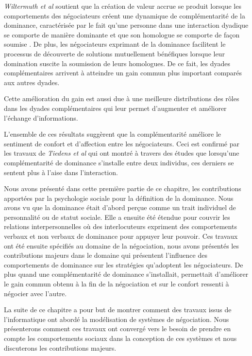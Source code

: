 	\emph{Wiltermuth et al} soutient que la création de valeur accrue se produit lorsque les comportements des négociateurs créent une dynamique de complémentarité de la dominance, caractérisée par le fait qu'une personne dans une interaction dyadique se comporte de manière dominante et que son homologue se comporte de façon soumise \cite{wiltermuth2015benefits}. De plus, les négociateurs exprimant de la dominance facilitent le processus de découverte de solutions mutuellement bénéfiques lorsque leur domination suscite la soumission de leurs homologues. De ce fait, les dyades complémentaires arrivent à atteindre un gain commun plus important comparés aux autres dyades.
	
	Cette amélioration du gain est aussi due à une meilleure distributions des rôles dans les dyades complémentaires qui leur permet d'augmenter et améliorer l'échange d'informations. 
	
	L'ensemble de ces résultats suggèrent que la complémentarité améliore le sentiment de confort et d'affection entre les négociateurs. Ceci est confirmé par les travaux de \emph{Tiedens et al} \cite{tiedens2003power} qui ont montré à travers des études que lorsqu'une complémentarité de dominance s'installe entre deux individus, ces derniers se sentent plus à l'aise dans l'interaction. 
	
	
	Nous avons présenté dans cette première partie de ce chapitre, les contributions apportées par la psychologie sociale pour la définition de la dominance. Nous avons vu que la dominance était d'abord perçue comme un trait individuel de personnalité ou de statut sociale. Elle a ensuite été étendue pour couvrir les relations interpersonnelles où des interlocuteurs expriment des comportements verbaux et non verbaux de dominance pour appuyer leur pouvoir. 
	Ces travaux ont été ensuite spécifiés au domaine de la négociation, nous avons présentés les contributions majeurs dans le domaine qui présentent l'influence des comportements de dominance sur les stratégies qu'adoptent les négociateurs. De plus quand une complémentarité de dominance s'installait, permettait d'améliorer le gain commun obtenu à la fin de la négociation et sur le confort ressenti à négocier avec l'autre.
	
	
	La suite de ce chapitre a pour but de montrer comment des travaux issus de l'informatique ont abordé la modélisation de systèmes de négociation. Nous présenterons comment ces travaux ont convergé vers le besoin de prendre en compte les comportements sociaux dans la conception de ces systèmes et nous discuterons les contributions majeurs.  
	
